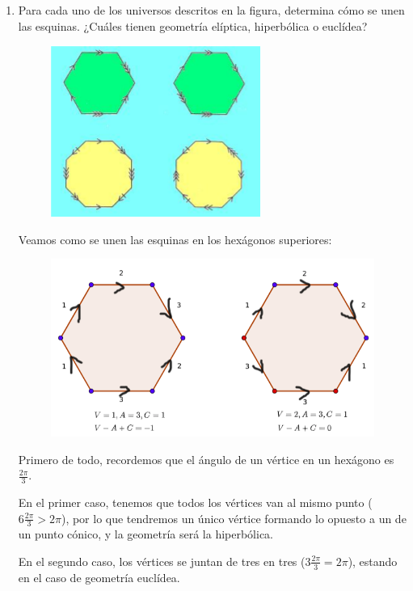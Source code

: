 \begin{enumerate}
\item Para cada uno de los universos descritos en la figura, determina cómo se unen las esquinas. ¿Cuáles tienen geometría elíptica, hiperbólica o euclídea?

\begin{figure}[H]
	\centering
	\includegraphics[scale=1]{images/geometria_universo/pagina_42_1.png}
\end{figure}

Veamos como se unen las esquinas en los hexágonos superiores:

\begin{figure}[H]
\centering
\includegraphics[scale=0.4]{images/geometria_universo/pagina_42_ej_1_a.png}
\end{figure}

Primero de todo, recordemos que el ángulo de un vértice en un hexágono es $\frac{2\pi}{3}$.

En el primer caso, tenemos que todos los vértices van al mismo punto ($6\frac{2\pi}{3}>2\pi$), por lo que tendremos un único vértice formando lo opuesto a un de un punto cónico, y la geometría será la hiperbólica.

En el segundo caso, los vértices se juntan de tres en tres ($3\frac{2\pi}{3}=2\pi$), estando en el caso de geometría euclídea.


\end{enumerate}
